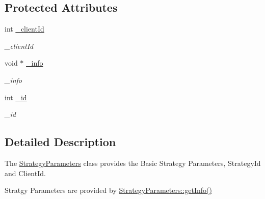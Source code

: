 \subsection*{Protected Attributes}
\begin{DoxyCompactItemize}
\item 
\hypertarget{class_a_p_i2_1_1_strategy_parameters_a5c9e2ede8bd448ecf1cd083fb4c164a1}{int \hyperlink{class_a_p_i2_1_1_strategy_parameters_a5c9e2ede8bd448ecf1cd083fb4c164a1}{\-\_\-client\-Id}}\label{class_a_p_i2_1_1_strategy_parameters_a5c9e2ede8bd448ecf1cd083fb4c164a1}

\begin{DoxyCompactList}\small\item\em \-\_\-client\-Id \end{DoxyCompactList}\item 
\hypertarget{class_a_p_i2_1_1_strategy_parameters_aecdc3adfd18c23b78beca308095a2e19}{void $\ast$ \hyperlink{class_a_p_i2_1_1_strategy_parameters_aecdc3adfd18c23b78beca308095a2e19}{\-\_\-info}}\label{class_a_p_i2_1_1_strategy_parameters_aecdc3adfd18c23b78beca308095a2e19}

\begin{DoxyCompactList}\small\item\em \-\_\-info \end{DoxyCompactList}\item 
\hypertarget{class_a_p_i2_1_1_strategy_parameters_a2d758363bfe8cfe044c37f7154160195}{int \hyperlink{class_a_p_i2_1_1_strategy_parameters_a2d758363bfe8cfe044c37f7154160195}{\-\_\-id}}\label{class_a_p_i2_1_1_strategy_parameters_a2d758363bfe8cfe044c37f7154160195}

\begin{DoxyCompactList}\small\item\em \-\_\-id \end{DoxyCompactList}\end{DoxyCompactItemize}


\subsection{Detailed Description}
The \hyperlink{class_a_p_i2_1_1_strategy_parameters}{Strategy\-Parameters} class provides the Basic Strategy Parameters, Strategy\-Id and Client\-Id.\par
 Stratgy Parameters are provided by \hyperlink{class_a_p_i2_1_1_strategy_parameters_a6a7c4d4c3e6cae23741c87732e89689a}{Strategy\-Parameters\-::get\-Info()} 

